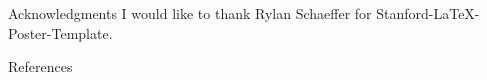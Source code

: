 \documentclass[final]{beamer}
\newlength{\sepwidth}
\newlength{\colwidth}
\newcommand{\separatorcolumn}{\begin{column}{\sepwidth}\end{column}}
\begin{document}
\begin{frame}[t]
\begin{columns}[t]
\begin{column}{\colwidth}
            \begin{block}{Acknowledgments}
                I would like to thank Rylan Schaeffer for Stanford-LaTeX-Poster-Template.
            \end{block}

            \begin{block}{References}
                \nocite{*}
                \footnotesize{}
            \end{block}

        \end{column}

        \separatorcolumn

    \end{columns}
\end{frame}
\end{document}
